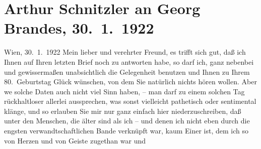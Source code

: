 

               \section[Arthur Schnitzler an Georg Brandes, 30. 1. 1922]{ Arthur Schnitzler an Georg Brandes, 30. 1. 1922}\nopagebreak{}\rehead{ }\begin{ledgroupsized}[t]{13cm}\normalsize\beginnumbering{} \toendnotes[C]{\smallbreak\pagebreak[2]} 
\toendnotes[C]{\smallbreak}\pstart
           \raggedleft{}{\pb}Wien, 30. 1. 1922\pend
           \pstart
           Mein lieber und verehrter Freund, es trifft sich gut, daß ich Ihnen
               auf Ihren letzten Brief noch zu antworten habe, so darf ich, ganz nebenbei und
               gewissermaßen unabsichtlich die Gelegenheit benutzen und Ihnen zu Ihrem
               80. Geburtstag Glück wünschen, von dem Sie natürlich nichts hören wollen. Aber we{\geminationn} solche Daten auch nicht viel Sinn haben, – man darf zu
               einem solchen Tag rückhaltloser  allerlei
               aussprechen, was sonst vielleicht pathetisch oder sentimental klänge, und so erlauben
               Sie mir nur ganz einfach hier niederzuschreiben, daß unter den Menschen, die älter
               sind als ich – und denen ich nicht eben durch die engsten verwandtschaftlichen Bande
               verknüpft war, kaum Einer ist, dem ich so von Herzen und von Geiste zugethan war und

\end{ledgroupsized}
